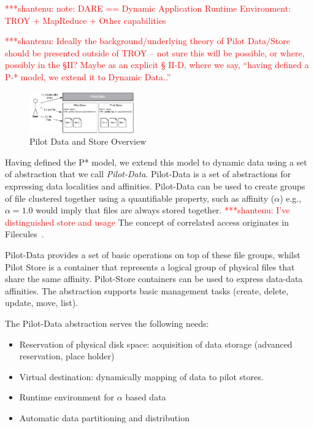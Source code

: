 \documentclass[conference,final]{IEEEtran}
\newcommand{\jhanote}[1]{ {\textcolor{red} { ***shantenu: #1 }}}
\newcommand{\jhanote}[1]{}
\begin{document}
\jhanote{note: DARE == Dynamic Application Runtime Environment: TROY +
  MapReduce + Other capabilities}

\jhanote{Ideally the background/underlying theory of Pilot Data/Store
  should be presented outside of TROY -- not sure this will be
  possible, or where, possibly in the \S II? Maybe as an explicit \S
  II-D, where we say, ``having defined a P-* model, we extend it to
  Dynamic Data..''}


\begin{figure}[t]
    \centering
        \includegraphics[width=0.4\textwidth]{figures/pilotstore.pdf}
    \caption{Pilot Data and Store Overview}
    \label{fig:figures_pilotstore}
\end{figure}

Having defined the P* model, we extend this model to dynamic data using a set of 
abstraction that we call \emph{Pilot-Data}. Pilot-Data is a set of abstractions 
for expressing data localities and affinities. Pilot-Data can be used to create 
groups of file clustered together using a quantifiable property, such as 
affinity ($\alpha$) e.g., $\alpha = 1.0$ would imply that files are always 
stored together. \jhanote{I've distinguished store and usage} The concept of
correlated access originates in
Filecules~\cite{Doraimani:2008:FGS:1383422.1383429}.

Pilot-Data provides a set of basic operations on top of these file
groups, whilst Pilot Store is a container that represents a logical
group of physical files that share the same affinity. Pilot-Store 
containers can be used to express data-data affinities. The abstraction 
supports basic management tasks (create, delete, update,
move, list). 


The Pilot-Data abstraction serves the following needs:
\begin{itemize}
	\item Reservation of physical disk space: acquisition of data storage (advanced reservation, place holder)
	\item Virtual destination: dynamically mapping of data to pilot stores.
	\item Runtime environment for $\alpha$ based data
	\item Automatic data partitioning and distribution
\end{itemize}
\end{document}
